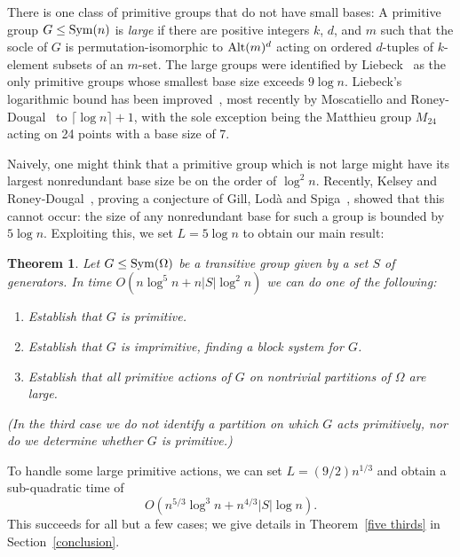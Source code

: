 \documentclass[12pt]{article}
\newcommand{\Sym}{{\rm Sym}}
\newcommand{\Alt}{{\rm Alt}}
\newtheorem{theorem}{Theorem}[section]
\begin{document}
There is one class of
primitive groups that do not have small bases:
A primitive group $G\leq\Sym(n)$ is {\em large}\/ if there are
positive integers $k$, $d$, and $m$ such that the socle of $G$ is
permutation-isomorphic to $\Alt(m)^d$ acting on ordered $d$-tuples of
$k$-element subsets of an $m$-set.  The large groups were identified
by Liebeck~\cite{liebeck1984minimal}\cite[Theorem 5.6C]{MR1409812}
 as the only primitive groups whose
smallest base size exceeds $9\log n$.
Liebeck's logarithmic bound has been
improved~\cite{HALASI201916,RoneyDougal2020}, most recently 
by Moscatiello and
Roney-Dougal~\cite{MoscatielloRoneyDougal2022} to
$\lceil\log n\rceil+1$,
with the sole exception being the Matthieu group $M_{24}$ acting on 24 points
with a base size of 7.

Naively, one might think that
a primitive group which is not large might
have its largest nonredundant base size be on the order of $\log^2 n$.
Recently, Kelsey and
Roney-Dougal~\cite{Kelsey2022-xi},
proving a conjecture of Gill, Lod\`a and Spiga~\cite{GILL_LODA_SPIGA_2022},
showed that this cannot occur:
the size of any nonredundant base for such a group is bounded by $5\log n$.
Exploiting this,
we set $L=5\log n$ to obtain our main result:

\begin{theorem}\label{main}
  Let $G\leq\Sym(\Omega)$ be a
  transitive group given by
  a set $S$ of generators.  In time $O(n\log^5 n+n|S|\log^2 n)$
  we can do one of the following:
  \begin{enumerate}
  \item Establish that $G$ is primitive.
  \item Establish that $G$ is imprimitive, finding a
    block system for $G$.
  \item Establish that all primitive actions of $G$
    on nontrivial partitions of $\Omega$ are large.
  \end{enumerate}
  (In the third case we do not identify a partition on which
  $G$ acts primitively, nor do we determine whether $G$ is primitive.)
\end{theorem}

To handle some large primitive actions, we can set $L=(9/2)n^{1/3}$
and obtain a sub-quadratic time of
$$O(n^{5/3}\log^3 n+n^{4/3}|S|\log n).$$
This succeeds for all but a few cases;
we give details in Theorem~\ref{five thirds} in Section~\ref{conclusion}.
\end{document}
